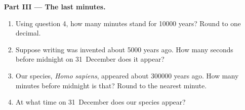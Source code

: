 \begin{problem}
\medskip
\noindent\textbf{Part III --- The last minutes.}\par\nopagebreak
\begin{enumerate}[resume, beginpenalty=10000]
  \item Using question 4, how many minutes stand for \num{10000} years?
        Round to one decimal.
  \item Suppose writing was invented about \num{5000} years ago. How
        many seconds before midnight on 31~December does it appear?
  \item Our species, \emph{Homo sapiens}, appeared about \num{300000}
        years ago. How many minutes before midnight is that? Round to
        the nearest minute.
  \item At what time on 31~December does our species appear?
\end{enumerate}
\end{problem}

